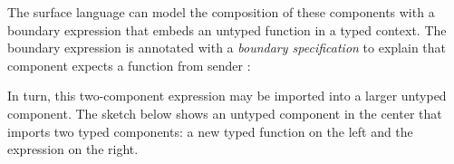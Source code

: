 \documentclass[ twoside,open=right,titlepage,numbers=noenddot,headinclude,%
                footinclude=true,cleardoublepage=empty,abstract=off,
                BCOR=5mm,paper=a4,fontsize=11pt,%
                ngerman,american,%
                parts,pdfspacing]{scrreprt}
\begin{document}

\noindent{}The surface language can model the composition of these components with a boundary
 expression that embeds an untyped function in a typed context.
The boundary expression is annotated with a \emph{boundary specification}
  to explain that
 component  expects a function from sender :


\noindent{}In turn, this two{-}component expression may be imported into a larger
 untyped component.
The sketch below shows an untyped component in the center that imports
 two typed components:
 a new typed function on the left and the expression \relax{\eqref{eq:bnd:e0}}
 on the right.
\end{document}
